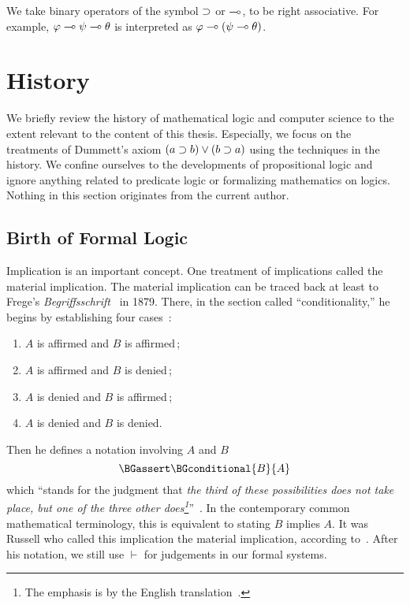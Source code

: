  We take binary operators of the symbol $\supset$ or $\multimap$,
 to be right associative.  For example, $\varphi\multimap\psi\multimap\theta$
 is interpreted as $\varphi\multimap(\psi\multimap\theta)$.

\section{History}

We briefly review the history of mathematical logic and computer science
to the extent relevant to the content of this thesis.
Especially, we focus on the treatments of Dummett's axiom $(a\supset
b)\lor(b\supset a)$ using the techniques in the history.
We confine ourselves to the developments of propositional logic and
ignore anything related to predicate logic or formalizing mathematics on
logics.  Nothing in this section originates from the current author.

\subsection{Birth of Formal Logic}

Implication is an important concept.
One treatment of implications called the material
implication.
The material implication can be traced back at least to
Frege's \textit{Begriffsschrift}~\citep{frege} in 1879.
There, in the
section called ``conditionality,''
he begins by establishing four cases~\citep[p.~13]{frege}:
\begin{enumerate}
 \item $A$ is affirmed and $B$ is affirmed\,;
 \item $A$ is affirmed and $B$ is denied\,;
 \item $A$ is denied and $B$ is affirmed\,;
 \item $A$ is denied and $B$ is denied.
\end{enumerate}
Then he defines a notation involving $A$ and $B$
\[
\BGassert\BGconditional{B}{A}
\]
which ``stands for the
judgment that \textit{the third of these possibilities does not take
place, but one of the three other does\footnote{The emphasis is by
the English translation~\citep[p.~14]{frege}.}}''~\citep[p.~14]{frege}.
In the contemporary common mathematical terminology, this is equivalent
to stating $B$ implies $A$.
It was Russell who called this implication the material implication,
according to~\citet{sep-conditionals}.
After his notation, we still use $\vdash$ for judgements in our formal systems.

